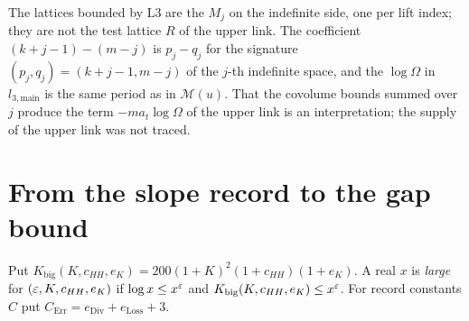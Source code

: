 \begin{remark}
The lattices bounded by $\mathrm{L3}$ are the $M_j$ on the indefinite side, one
per lift index; they are not the test lattice $R$ of the upper link. The
coefficient $(k+j-1)-(m-j)$ is $p_j-q_j$ for the signature
$(p_j,q_j)=(k+j-1,m-j)$ of the $j$-th indefinite space, and the $\log\Omega$ in
$l_{3,\mathrm{main}}$ is the same period as in $\mathcal M(u)$. That the
covolume bounds summed over $j$ produce the term $-ma_t\log\Omega$ of the
upper link is an interpretation; the supply of the upper link was not traced.
\end{remark}

\section{From the slope record to the gap bound}

\begin{definition}\label{geob:largex}
Put $K_{\mathrm{big}}(K,c_{HH},e_K)=200(1+K)^2(1+c_{HH})(1+e_K)$. A real $x$ is
\emph{large} for $(\varepsilon,K,c_{HH},e_K)$ if $\log x\le x^{\varepsilon}$ and
$K_{\mathrm{big}}(K,c_{HH},e_K)\le x^{\varepsilon}$. For record constants $C$ put
$C_{\mathrm{Err}}=e_{\mathrm{Div}}+e_{\mathrm{Loss}}+3$.
\end{definition}

